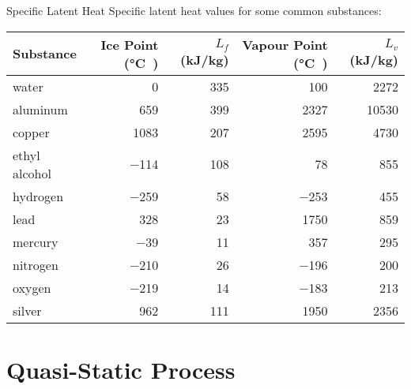 \documentclass[12pt,aspectratio=169,dvipsnames]{beamer}
\begin{document}
\begin{frame}{Specific Latent Heat}
  Specific latent heat values for some common substances:
  \begin{center}
    \begin{tabular}{|l|r|r|r|r|}
      \hline
      \rowcolor{pink}
      Substance & Ice Point (\si\celsius) & $L_f$ (\si{kJ/kg}) &
      Vapour Point (\si\celsius) & $L_v$ (\si{kJ/kg}) \\ \hline
      water         & \num{   0} & \num{335} & \num{ 100} & \num{ 2272} \\
      aluminum      & \num{ 659} & \num{399} & \num{2327} & \num{10530} \\
      copper        & \num{1083} & \num{207} & \num{2595} & \num{ 4730} \\
      ethyl alcohol & \num{-114} & \num{108} & \num{  78} & \num{  855} \\
      hydrogen      & \num{-259} & \num{ 58} & \num{-253} & \num{  455} \\
      lead          & \num{ 328} & \num{ 23} & \num{1750} & \num{  859} \\
      mercury       & \num{ -39} & \num{ 11} & \num{ 357} & \num{  295} \\
      nitrogen      & \num{-210} & \num{ 26} & \num{-196} & \num{  200} \\
      oxygen        & \num{-219} & \num{ 14} & \num{-183} & \num{  213} \\
      silver        & \num{ 962} & \num{111} & \num{1950} & \num{ 2356} \\
      \hline
    \end{tabular}
  \end{center}
\end{frame}



\section{Quasi-Static Process}
\end{document}
